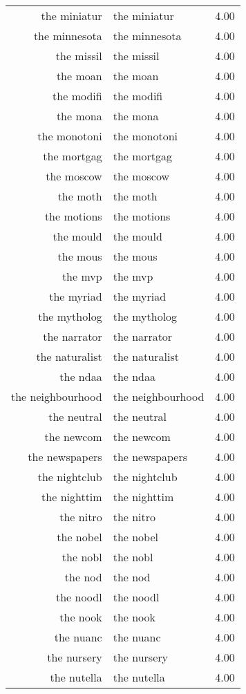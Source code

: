 \begin{table}[ht]
\begin{tabular}{rlr}
  the miniatur & the miniatur & 4.00 \\ 
  the minnesota & the minnesota & 4.00 \\ 
  the missil & the missil & 4.00 \\ 
  the moan & the moan & 4.00 \\ 
  the modifi & the modifi & 4.00 \\ 
  the mona & the mona & 4.00 \\ 
  the monotoni & the monotoni & 4.00 \\ 
  the mortgag & the mortgag & 4.00 \\ 
  the moscow & the moscow & 4.00 \\ 
  the moth & the moth & 4.00 \\ 
  the motions & the motions & 4.00 \\ 
  the mould & the mould & 4.00 \\ 
  the mous & the mous & 4.00 \\ 
  the mvp & the mvp & 4.00 \\ 
  the myriad & the myriad & 4.00 \\ 
  the mytholog & the mytholog & 4.00 \\ 
  the narrator & the narrator & 4.00 \\ 
  the naturalist & the naturalist & 4.00 \\ 
  the ndaa & the ndaa & 4.00 \\ 
  the neighbourhood & the neighbourhood & 4.00 \\ 
  the neutral & the neutral & 4.00 \\ 
  the newcom & the newcom & 4.00 \\ 
  the newspapers & the newspapers & 4.00 \\ 
  the nightclub & the nightclub & 4.00 \\ 
  the nighttim & the nighttim & 4.00 \\ 
  the nitro & the nitro & 4.00 \\ 
  the nobel & the nobel & 4.00 \\ 
  the nobl & the nobl & 4.00 \\ 
  the nod & the nod & 4.00 \\ 
  the noodl & the noodl & 4.00 \\ 
  the nook & the nook & 4.00 \\ 
  the nuanc & the nuanc & 4.00 \\ 
  the nursery & the nursery & 4.00 \\ 
  the nutella & the nutella & 4.00 \\ 

\end{tabular}
\end{table}
